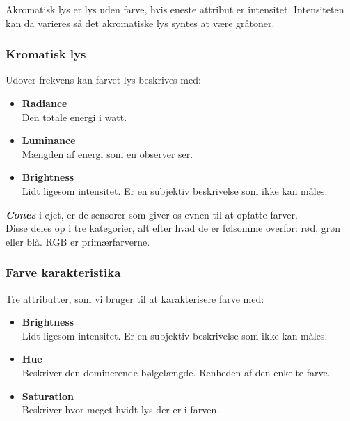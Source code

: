 Akromatisk lys er lys uden farve, hvis eneste attribut er intensitet. Intensiteten kan da varieres så det akromatiske lys syntes at være gråtoner.

\subsubsection{Kromatisk lys}

Udover frekvens kan farvet lys beskrives med:

\begin{itemize}
	\item \textbf{Radiance}\\
	Den totale energi i watt.
	
	\item \textbf{Luminance}\\
	Mængden af energi som en observer ser.
	
	\item \textbf{Brightness}\\
	Lidt ligesom intensitet. Er en subjektiv beskrivelse som ikke kan måles.
\end{itemize}

\textbf{\textit{Cones}} i øjet, er de sensorer som giver os evnen til at opfatte farver.\\
Disse deles op i tre kategorier, alt efter hvad de er følsomme overfor: rød, grøn eller blå. RGB er primærfarverne. 

\subsubsection{Farve karakteristika}

Tre attributter, som vi bruger til at karakterisere farve med: 

\begin{itemize}
	\item \textbf{Brightness}\\
	Lidt ligesom intensitet. Er en subjektiv beskrivelse som ikke kan måles.
	
	\item \textbf{Hue}\\
	Beskriver den dominerende bølgelængde. Renheden af den enkelte farve.
	
	\item \textbf{Saturation}\\
	Beskriver hvor meget hvidt lys der er i farven.
\end{itemize}
